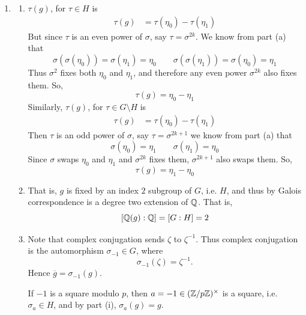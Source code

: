 \documentclass[12pt]{article}
\begin{document}
\begin{solution}
\begin{enumerate}
\begin{enumerate}
        \end{enumerate}
       
        Hence, 
        \[g = \sum_{i=0}^{p-2} (-1)^i \sigma^i(\zeta) = \eta_0 - \eta_1.\]

        \item [(d)] \begin{enumerate}
            \item [(i)] $\tau(g)$, for $\tau \in H$ is 
                        \begin{align*}
                            \tau(g) &= \tau(\eta_0) - \tau(\eta_1)
                        \end{align*}
                        But since $\tau$ is an even power of $\sigma$, say $\tau = \sigma^{2k}$. We know from part (a) that 
                        \[\sigma(\sigma(\eta_0)) = \sigma(\eta_1) = \eta_0 \qquad \sigma(\sigma(\eta_1)) = \sigma(\eta_0) = \eta_1\] 
                        Thus $\sigma^2$ fixes both $\eta_0$ and $\eta_1$, and therefore any even power $\sigma^{2k}$ also fixes them. So, 
                        \[\tau(g) = \eta_0 - \eta_1\]
                        Similarly, $\tau(g)$, for $\tau \in G\setminus H$ is 
                        \begin{align*}
                            \tau(g) &= \tau(\eta_0) - \tau(\eta_1)
                        \end{align*}
                    Then $\tau$ is an odd power of $\sigma$, say $\tau = \sigma^{2k+1}$ we know from part (a) that \[\sigma(\eta_0) = \eta_1 \qquad \sigma(\eta_1) = \eta_0\] 
                    Since $\sigma$ swaps $\eta_0$ and $\eta_1$ and $\sigma^{2k}$ fixes them, $\sigma^{2k+1}$ also swaps them. So, 
                        \[\tau(g) = \eta_1 - \eta_0\]

            \item [(ii)] That is, $g$ is fixed by an index $2$ subgroup of $G$, i.e. $H$, and thus by Galois correspondence is a degree two extension of $\mathbb Q$. That is, 
                        \[[\mathbb Q(g):\mathbb Q] = [G:H] = 2\]

            \item [(iii)] Note that complex conjugation sends $\zeta$ to $\zeta^{-1}$. Thus complex conjugation is the automorphism $\sigma_{-1} \in G$, where
            \[
            \sigma_{-1}(\zeta) = \zeta^{-1}.
            \]
            Hence $\overline{g} = \sigma_{-1}(g)$.

            If $-1$ is a square modulo $p$, then $a = -1 \in (\mathbb Z/p\mathbb Z)^\times$ is a square, i.e. $\sigma_a \in H$, and by part (i), $\sigma_a(g) = g$. 
            

\end{enumerate}
\end{enumerate}
\end{solution}
\end{document}
